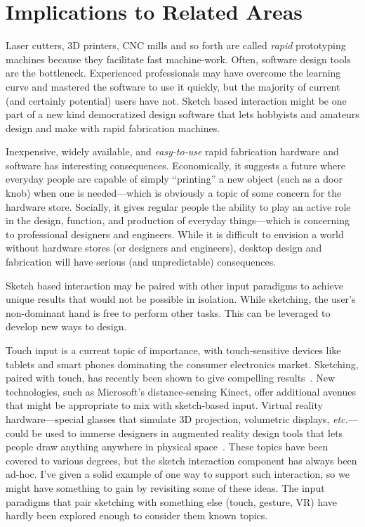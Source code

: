 \section{Implications to Related Areas}


Laser cutters, 3D printers, CNC mills and so forth are called
\textit{rapid} prototyping machines because they facilitate fast
machine-work. Often, software design tools are the
bottleneck. Experienced professionals may have overcome the learning
curve and mastered the software to use it quickly, but the majority of
current (and certainly potential) users have not. Sketch based
interaction might be one part of a new kind democratized design
software that lets hobbyists and amateurs design and make with rapid
fabrication machines.

Inexpensive, widely available, and \textit{easy-to-use} rapid
fabrication hardware and software has interesting
consequences. Economically, it suggests a future where everyday people
are capable of simply ``printing'' a new object (such as a door knob)
when one is needed---which is obviously a topic of some concern for
the hardware store. Socially, it gives regular people the ability to
play an active role in the design, function, and production of
everyday things---which is concerning to professional designers and
engineers. While it is difficult to envision a world without hardware
stores (or designers and engineers), desktop design and fabrication
will have serious (and unpredictable) consequences.

Sketch based interaction may be paired with other input paradigms to
achieve unique results that would not be possible in isolation. While
sketching, the user's non-dominant hand is free to perform other
tasks. This can be leveraged to develop new ways to design. 

Touch input is a current topic of importance, with touch-sensitive
devices like tablets and smart phones dominating the consumer
electronics market. Sketching, paired with touch, has recently been
shown to give compelling results~\cite{hinckley-pen-touch}. New
technologies, such as Microsoft's distance-sensing Kinect, offer
additional avenues that might be appropriate to mix with sketch-based
input. Virtual reality hardware---special glasses that simulate 3D
projection, volumetric displays, \textit{etc.}---could be used to
immerse designers in augmented reality design tools that lets people
draw anything anywhere in physical space~\cite{jung-lightpen}. These
topics have been covered to various degrees, but the sketch
interaction component has always been ad-hoc. I've given a solid
example of one way to support such interaction, so we might have
something to gain by revisiting some of these ideas. The input
paradigms that pair sketching with something else (touch, gesture, VR)
have hardly been explored enough to consider them known topics.

